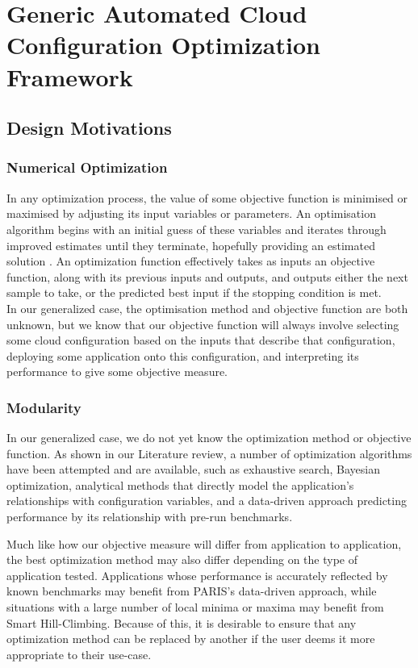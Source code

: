 \documentclass{report}
\begin{document}
\chapter{Generic Automated Cloud Configuration Optimization Framework}
\section{Design Motivations}
\subsection{Numerical Optimization}
In any optimization process, the value of some objective function is minimised or maximised by adjusting its input variables or parameters. An optimisation algorithm begins with an initial guess of these variables and iterates through improved estimates until they terminate, hopefully providing an estimated solution \cite{Nocedal2006}. An optimization function effectively takes as inputs an objective function, along with its previous inputs and outputs, and outputs either the next sample to take, or the predicted best input if the stopping condition is met. \\
In our generalized case, the optimisation method and objective function are both unknown, but we know that our objective function will always involve selecting some cloud configuration based on the inputs that describe that configuration, deploying some application onto this configuration, and interpreting its performance to give some objective measure.
 

\subsection{Modularity}
In our generalized case, we do not yet know the optimization method or objective function. As shown in our Literature review, a number of optimization algorithms have been attempted and are available, such as exhaustive search, Bayesian optimization\cite{Alipourfard2017}, analytical methods that directly model the application's relationships with configuration variables\cite{Venkataraman2016}, and a data-driven approach predicting performance by its relationship with pre-run benchmarks\cite{Yadwadkar2017}.

Much like how our objective measure will differ from application to application, the best optimization method may also differ depending on the type of application tested. Applications whose performance is accurately reflected by known benchmarks may benefit from PARIS's data-driven approach, while situations with a large number of local minima or maxima may benefit from Smart Hill-Climbing. Because of this, it is desirable to ensure that any optimization method can be replaced by another if the user deems it more appropriate to their use-case.
\end{document}
